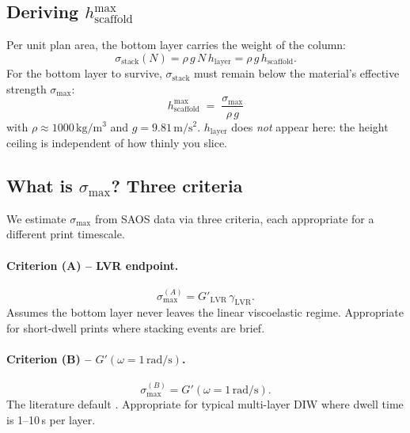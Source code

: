 \documentclass[11pt,a4paper]{article}
\begin{document}
\subsection{Deriving $h_\mathrm{scaffold}^{\max}$}

Per unit plan area, the bottom layer carries the weight of the column:
\begin{equation}
\sigma_\mathrm{stack}(N) = \rho\,g\,N\,h_\mathrm{layer}
                         = \rho\,g\,h_\mathrm{scaffold}.
\label{eq:sigma_stack}
\end{equation}
For the bottom layer to survive, $\sigma_\mathrm{stack}$ must remain
below the material's effective strength $\sigma_\mathrm{max}$:
\begin{equation}
\boxed{\,h_\mathrm{scaffold}^{\max}
 \;=\; \frac{\sigma_\mathrm{max}}{\rho\,g}\,}
\label{eq:hmax_master}
\end{equation}
with $\rho\approx 1000\,\si{\kg\per\m^3}$ and $g=9.81\,\si{\m/\s^2}$.
$h_\mathrm{layer}$ does \emph{not} appear here: the height ceiling is
independent of how thinly you slice.

\subsection{What is $\sigma_\mathrm{max}$? Three criteria}
\label{sec:three_criteria}

We estimate $\sigma_\mathrm{max}$ from SAOS data via three criteria,
each appropriate for a different print timescale.

\paragraph{Criterion (A) -- LVR endpoint.}
\begin{equation}
\sigma_\mathrm{max}^{(A)} = G'_\mathrm{LVR}\,\gamma_\mathrm{LVR}.
\label{eq:sigmaA}
\end{equation}
Assumes the bottom layer never leaves the linear viscoelastic regime.
Appropriate for short-dwell prints where stacking events are brief.

\paragraph{Criterion (B) -- $G'(\omega=1\,\si{\radian\per\s})$.}
\begin{equation}
\sigma_\mathrm{max}^{(B)} = G'(\omega=1\,\si{\radian\per\s}).
\label{eq:sigmaB}
\end{equation}
The literature default \citep{PaxtonEtAl2017, SchwabEtAl2020}.
Appropriate for typical multi-layer DIW where dwell time is 1--10\,\si{\s}
per layer.
\end{document}
